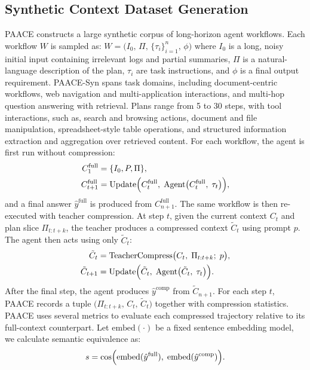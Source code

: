 \documentclass{article}
\theoremstyle{plain}
\theoremstyle{definition}
\theoremstyle{remark}
\begin{document}
\subsection{Synthetic Context Dataset Generation}

PAACE constructs a large synthetic corpus of long-horizon
agent workflows.
Each workflow \(W\) is sampled as:
$W = \bigl(I_0,\, \Pi,\, \{\tau_i\}_{i=1}^n,\, \phi\bigr)$
where \(I_0\) is a long, noisy initial input containing irrelevant logs and partial
summaries, \(\Pi\) is a natural-language description of the plan, \(\tau_i\) are task instructions,
and \(\phi\) is a final output requirement. PAACE-Syn spans task domains,
including document-centric workflows, web navigation and multi-application interactions, and multi-hop question answering with retrieval. Plans range from 5 to 30 steps, with tool interactions, such as,
search and browsing actions, document and file manipulation,
spreadsheet-style table operations, and structured information
extraction and aggregation over retrieved content. For each workflow, the agent is first run without compression:
\begin{align}
    C^{\mathrm{full}}_1 &= \{I_0, P, \Pi\}, \\
    C^{\mathrm{full}}_{t+1}
    &= \mathrm{Update}\Bigl(
        C^{\mathrm{full}}_t,\;
        \mathrm{Agent}\bigl(C^{\mathrm{full}}_t,\; \tau_t\bigr)
    \Bigr),
\end{align}
and a final answer \(\hat{y}^{\mathrm{full}}\) is produced from \(C^{\mathrm{full}}_{n+1}\). The same workflow is then re-executed with teacher compression.
At step \(t\), given the current context \(C_t\) and plan slice \(\Pi_{t:t+k}\),
the teacher produces a compressed context \(\tilde{C}_t\) using prompt \(p\).
The agent then acts using only \(\tilde{C}_t\):
\begin{align}
    \tilde{C}_t &= \mathrm{TeacherCompress}\bigl(C_t,\; \Pi_{t:t+k};\; p\bigr),
    \\
    \tilde{C}_{t+1}
    &= \mathrm{Update}\Bigl(
        \tilde{C}_t,\;
        \mathrm{Agent}\bigl(\tilde{C}_t,\; \tau_t\bigr)
    \Bigr).
\end{align}
After the final step, the agent produces \(\hat{y}^{\mathrm{comp}}\) from \(\tilde{C}_{n+1}\). For each step \(t\), PAACE records a tuple
$
    \bigl(\Pi_{t:t+k},\, C_t,\, \tilde{C}_t\bigr)$
together with compression statistics. PAACE uses several metrics to evaluate each compressed trajectory relative to its full-context
counterpart. Let \(\mathrm{embed}(\cdot)\) be a fixed sentence embedding model, we calculate semantic equivalence as:
\begin{equation}
    s = \cos\Bigl(
        \mathrm{embed}(\hat{y}^{\mathrm{full}}),\;
        \mathrm{embed}(\hat{y}^{\mathrm{comp}})
    \Bigr).
\end{equation}
\end{document}
